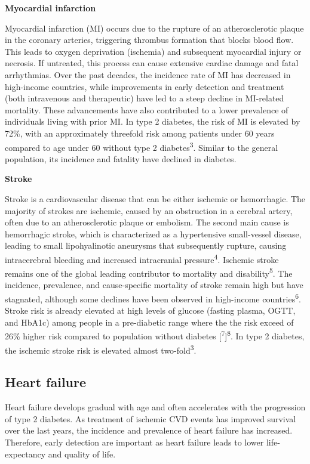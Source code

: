 \documentclass[
  a4paper,
  headsepline=true,
  open=any]{scrbook}
\begin{document}
\textbf{Myocardial infarction}

Myocardial infarction (MI) occurs due to the rupture of an
atherosclerotic plaque in the coronary arteries, triggering thrombus
formation that blocks blood flow. This leads to oxygen deprivation
(ischemia) and subsequent myocardial injury or necrosis. If untreated,
this process can cause extensive cardiac damage and fatal arrhythmias.
Over the past decades, the incidence rate of MI has decreased in
high-income countries, while improvements in early detection and
treatment (both intravenous and therapeutic) have led to a steep decline
in MI-related mortality. These advancements have also contributed to a
lower prevalence of individuals living with prior MI. In type 2
diabetes, the risk of MI is elevated by 72\%, with an approximately
threefold risk among patients under 60 years compared to age under 60
without type 2 diabetes\textsuperscript{3}. Similar to the general
population, its incidence and fatality have declined in diabetes.

\textbf{Stroke}

Stroke is a cardiovascular disease that can be either ischemic or
hemorrhagic. The majority of strokes are ischemic, caused by an
obstruction in a cerebral artery, often due to an atherosclerotic plaque
or embolism. The second main cause is hemorrhagic stroke, which is
characterized as a hypertensive small-vessel disease, leading to small
lipohyalinotic aneurysms that subsequently rupture, causing
intracerebral bleeding and increased intracranial
pressure\textsuperscript{4}. Ischemic stroke remains one of the global
leading contributor to mortality and disability\textsuperscript{5}. The
incidence, prevalence, and cause-specific mortality of stroke remain
high but have stagnated, although some declines have been observed in
high-income countries\textsuperscript{6}. Stroke risk is already
elevated at high levels of glucose (fasting plasma, OGTT, and HbA1c)
among people in a pre-diabetic range where the the risk exceed of 26\%
higher risk compared to population without diabetes
{[}\textsuperscript{7}{]}\textsuperscript{8}. In type 2 diabetes, the
ischemic stroke risk is elevated almost two-fold\textsuperscript{3}.

\hypertarget{heart-failure}{%
\subsection{Heart failure}\label{heart-failure}}

Heart failure develops gradual with age and often accelerates with the
progression of type 2 diabetes. As treatment of ischemic CVD events has
improved survival over the last years, the incidence and prevalence of
heart failure has increased. Therefore, early detection are important as
heart failure leads to lower life-expectancy and quality of life.
\end{document}
